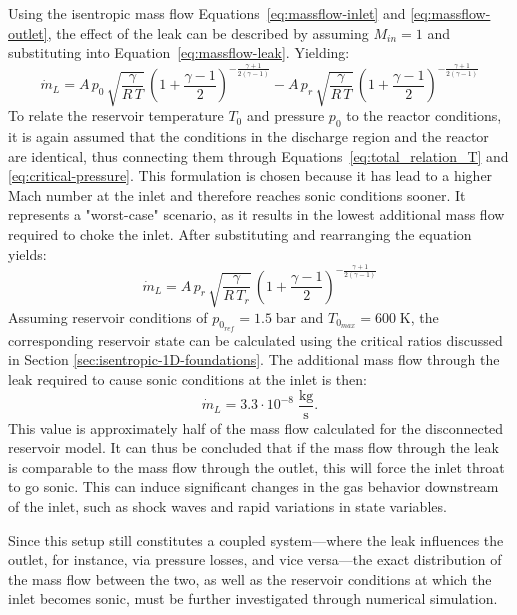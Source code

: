 	Using the isentropic mass flow Equations~\eqref{eq:massflow-inlet} and \eqref{eq:massflow-outlet}, the effect of the leak can be described by assuming $M_{in} = 1$ and substituting into Equation~\eqref{eq:massflow-leak}.
	Yielding:
	$$
	    \dot{m}_L =
	    A\, p_0\, \sqrt{\frac{\gamma}{R\,T}}\, \left(1+\frac{\gamma-1}{2}\right)^{-\frac{\gamma+1}{2(\gamma-1)}}
	    - A\, p_r\, \sqrt{\frac{\gamma}{R\,T}}\, \left(1+\frac{\gamma-1}{2}\right)^{-\frac{\gamma+1}{2(\gamma-1)}}
	$$
	To relate the reservoir temperature $T_0$ and pressure $p_0$ to the reactor conditions, it is again assumed that the conditions in the discharge region and the reactor are identical, thus connecting them through Equations~\eqref{eq:total_relation_T} and \eqref{eq:critical-pressure}.
	This formulation is chosen because it has lead to a higher Mach number at the inlet and therefore reaches sonic conditions sooner.
	It represents a "worst-case" scenario, as it results in the lowest additional mass flow required to choke the inlet.
	After substituting and rearranging the equation yields:
	\begin{equation}
	    \dot{m}_L =
	    A\, p_r\, \sqrt{\frac{\gamma}{R\, T_r}}\,
	    \left(1 + \frac{\gamma - 1}{2}\right)^{-\frac{\gamma + 1}{2(\gamma - 1)}}
	\end{equation}
	Assuming reservoir conditions of $p_{0_{ref}} = 1.5\;\text{bar}$ and $T_{0_{max}} = 600\;\text{K}$, the corresponding reservoir state can be calculated using the critical ratios discussed in Section \ref{sec:isentropic-1D-foundations}.
	The additional mass flow through the leak required to cause sonic conditions at the inlet is then:
	$$
	    \dot{m}_L = 3.3 \cdot 10^{-8} \; \frac{\text{kg}}{\text{s}}.
	$$
	This value is approximately half of the mass flow calculated for the disconnected reservoir model.
	It can thus be concluded that if the mass flow through the leak is comparable to the mass flow through the outlet, this will force the inlet throat to go sonic.
	This can induce significant changes in the gas behavior downstream of the inlet, such as shock waves and rapid variations in state variables.

	Since this setup still constitutes a coupled system—where the leak influences the outlet, for instance, via pressure losses, and vice versa—the exact distribution of the mass flow between the two, as well as the reservoir conditions at which the inlet becomes sonic, must be further investigated through numerical simulation.

